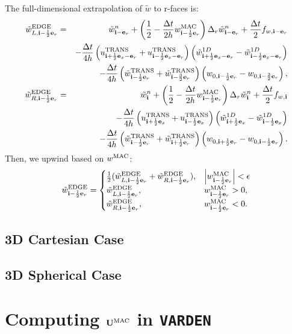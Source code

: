 \documentclass[11pt]{article}
\def\half  {\frac{1}{2}}
\def\dt    {\Delta t}
\def\edge  {\rm EDGE}
\def\mac   {\rm MAC}
\def\trans {\rm TRANS}
\def\eb    {{\bf e}}
\def\ib    {{\bf i}}
\def\Ub    {{\bf U}}
\def\wt    {\tilde{w}}
\begin{document}
The full-dimensional extrapolation of $\wt$ to r-faces is:
\begin{eqnarray}
\wt_{L,\ib-\half\eb_r}^{\edge} &=& \wt_{\ib-\eb_r}^n + \left(\half - \frac{\dt}{2h}w_{\ib-\half\eb_r}^{\mac}\right)\Delta_r \wt_{\ib-\eb_r}^n + \frac{\dt}{2}f_{w,\ib-\eb_r} \nonumber \\
&& - \frac{\dt}{4h}\left(u_{\ib+\half\eb_x-\eb_r}^{\trans}+u_{\ib-\half\eb_x-\eb_r}^{\trans}\right)\left(\wt_{\ib+\half\eb_x-\eb_r}^{1D} - \wt_{\ib-\half\eb_x-\eb_r}^{1D}\right) \nonumber \\
&& -
\frac{\dt}{4h}\left(\wt_{\ib-\half\eb_r}^{\trans}+\wt_{\ib-\frac{3}{2}\eb_r}^{\trans}\right)\left(w_{0,\ib-\half\eb_r}-w_{0,\ib-\frac{3}{2}\eb_r}\right),\\
\wt_{R,\ib-\half\eb_r}^{\edge} &=& \wt_{\ib}^n + \left(\half - \frac{\dt}{2h}w_{\ib-\half\eb_r}^{\mac}\right)\Delta_r \wt_{\ib}^n + \frac{\dt}{2}f_{w,\ib} \nonumber \\
&& - \frac{\dt}{4h}\left(u_{\ib+\half\eb_x}^{\trans}+u_{\ib-\half\eb_x}^{\trans}\right)\left(\wt_{\ib+\half\eb_x}^{1D} - \wt_{\ib-\half\eb_x}^{1D}\right) \nonumber \\
&& -
\frac{\dt}{4h}\left(\wt_{\ib-\half\eb_r}^{\trans}+\wt_{\ib+\half\eb_r}^{\trans}\right)\left(w_{0,\ib+\half\eb_r}-w_{0,\ib-\half\eb_r}\right).
\end{eqnarray}
Then, we upwind based on $w^{\mac}$:
\begin{equation}
\wt_{\ib-\half\eb_r}^{\edge} =
\begin{cases}
\half(\wt_{L,\ib-\half\eb_r}^{\edge} + \wt_{R,\ib-\half\eb_r}^{\edge}), & \left|w^{\mac}_{\ib-\half\eb_r}\right| < \epsilon \\
\wt_{L,\ib-\half\eb_r}^{\edge}, & w^{\mac}_{\ib-\half\eb_r} > 0, \\
\wt_{R,\ib-\half\eb_r}^{\edge}, & w^{\mac}_{\ib-\half\eb_r} < 0.
\end{cases}
\end{equation}
\subsection{3D Cartesian Case}
\subsection{3D Spherical Case}
\cleardoublepage
\section{Computing $\Ub^{\mac}$ in {\tt VARDEN}}
\end{document}
